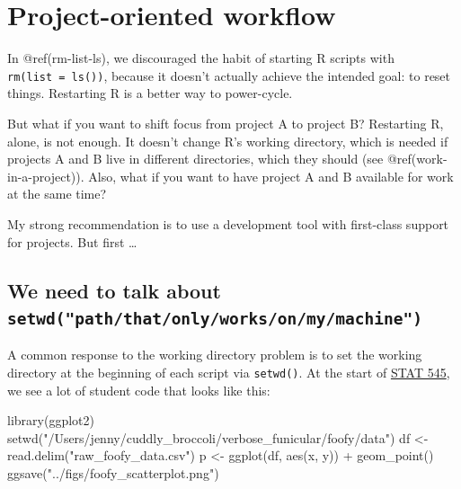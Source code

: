 \documentclass[
  letterpaper,
]{book}
\newenvironment{Shaded}{\begin{snugshade}}{\end{snugshade}}
\newcommand{\FunctionTok}[1]{\textcolor[rgb]{0.28,0.35,0.67}{#1}}
\newcommand{\NormalTok}[1]{\textcolor[rgb]{0.00,0.23,0.31}{#1}}
\newcommand{\OtherTok}[1]{\textcolor[rgb]{0.00,0.23,0.31}{#1}}
\newcommand{\SpecialCharTok}[1]{\textcolor[rgb]{0.37,0.37,0.37}{#1}}
\newcommand{\StringTok}[1]{\textcolor[rgb]{0.13,0.47,0.30}{#1}}
\begin{document}
\hypertarget{project-oriented-workflow}{%
\chapter{Project-oriented workflow}\label{project-oriented-workflow}}

In @ref(rm-list-ls), we discouraged the habit of starting R scripts with
\texttt{rm(list\ =\ ls())}, because it doesn't actually achieve the
intended goal: to reset things. Restarting R is a better way to
power-cycle.

But what if you want to shift focus from project A to project B?
Restarting R, alone, is not enough. It doesn't change R's working
directory, which is needed if projects A and B live in different
directories, which they should (see @ref(work-in-a-project)). Also, what
if you want to have project A and B available for work at the same time?

My strong recommendation is to use a development tool with first-class
support for projects. But first \ldots{}

\hypertarget{setwd}{%
\section{\texorpdfstring{We need to talk about
\texttt{setwd("path/that/only/works/on/my/machine")}}{We need to talk about setwd("path/that/only/works/on/my/machine")}}\label{setwd}}

A common response to the working directory problem is to set the working
directory at the beginning of each script via \texttt{setwd()}. At the
start of \href{http://stat545.com}{STAT 545}, we see a lot of student
code that looks like this:

\begin{Shaded}
\begin{Highlighting}[]
\FunctionTok{library}\NormalTok{(ggplot2)}
\FunctionTok{setwd}\NormalTok{(}\StringTok{"/Users/jenny/cuddly\_broccoli/verbose\_funicular/foofy/data"}\NormalTok{)}
\NormalTok{df }\OtherTok{\textless{}{-}} \FunctionTok{read.delim}\NormalTok{(}\StringTok{"raw\_foofy\_data.csv"}\NormalTok{)}
\NormalTok{p }\OtherTok{\textless{}{-}} \FunctionTok{ggplot}\NormalTok{(df, }\FunctionTok{aes}\NormalTok{(x, y)) }\SpecialCharTok{+} \FunctionTok{geom\_point}\NormalTok{()}
\FunctionTok{ggsave}\NormalTok{(}\StringTok{"../figs/foofy\_scatterplot.png"}\NormalTok{)}
\end{Highlighting}
\end{Shaded}
\end{document}
